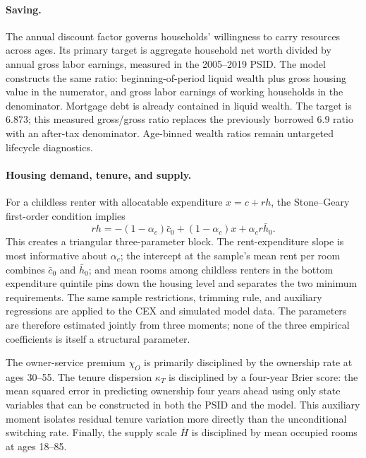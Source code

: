 \documentclass[11pt]{article}
\begin{document}
\paragraph{Saving.}
The annual discount factor governs households' willingness to carry resources
across ages. Its primary target is aggregate household net worth divided by
annual gross labor earnings, measured in the 2005--2019 PSID. The model
constructs the same ratio: beginning-of-period liquid wealth plus gross housing
value in the numerator, and gross labor earnings of working households in the
denominator. Mortgage debt is already contained in liquid wealth. The target is
$6.873$; this measured gross/gross ratio replaces the previously borrowed
$6.9$ ratio with an after-tax denominator. Age-binned wealth ratios remain
untargeted lifecycle diagnostics.

\paragraph{Housing demand, tenure, and supply.}
For a childless renter with allocatable expenditure $x=c+rh$, the Stone--Geary
first-order condition implies
\begin{equation}
rh=-(1-\alpha_c)\bar c_0+(1-\alpha_c)x+\alpha_c r\bar h_0.
\label{eq:les_mapping}
\end{equation}
This creates a triangular three-parameter block. The rent-expenditure slope is
most informative about $\alpha_c$; the intercept at the sample's mean rent per
room combines $\bar c_0$ and $\bar h_0$; and mean rooms among childless renters
in the bottom expenditure quintile pins down the housing level and separates
the two minimum requirements. The same sample restrictions, trimming rule, and
auxiliary regressions are applied to the CEX and simulated model data. The
parameters are therefore estimated jointly from three moments; none of the
three empirical coefficients is itself a structural parameter.

The owner-service premium $\chi_O$ is primarily disciplined by the ownership
rate at ages 30--55. The tenure dispersion $\kappa_T$ is disciplined by a
four-year Brier score: the mean squared error in predicting ownership four
years ahead using only state variables that can be constructed in both the
PSID and the model. This auxiliary moment isolates residual tenure variation
more directly than the unconditional switching rate. Finally, the supply scale
$\bar H$ is disciplined by mean occupied rooms at ages 18--85.
\end{document}
